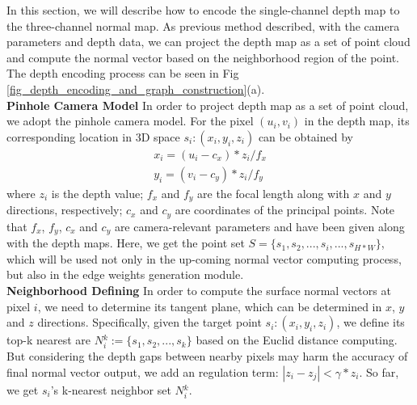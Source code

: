 \documentclass[journal]{IEEEtran}
\begin{document}
 
    In this section, we will describe how to encode the single-channel depth map to the three-channel normal map. As previous method \cite{yin2018geonet} described, with the camera parameters and depth data, we can project the depth map as a set of point cloud and compute the normal vector based on the neighborhood region of the point. The depth encoding process can be seen in Fig \ref{fig_depth_encoding_and_graph_construction}(a).\\   
 
    \textbf{Pinhole Camera Model}  In order to project depth map as a set of point cloud, we adopt the pinhole camera model. For the pixel $(u_{i},v_{i})$ in the depth map, its corresponding location in 3D space $\mathit{s_{i}}:(x_{i},y_{i},z_{i})$ can be obtained by
    \begin{equation}
        \begin{split}
        x_{i} = (u_{i} - c_{x})*z_{i}/f_{x}\\
        y_{i} = (v_{i} - c_{y})*z_{i}/f_{y}
        \end{split}
    \end{equation}
    where $z_{i}$ is the depth value; $f_{x}$ and $f_{y}$ are the focal length along with $x$ and $y$ directions, respectively; $c_{x}$ and $c_{y}$ are coordinates of the principal points. Note that $f_{x}$, $f_{y}$, $c_{x}$ and $c_{y}$ are camera-relevant parameters and have been given along with the depth maps. Here, we get the point set ${S}=\{ {s_{1}}, {s_{2}}, ..., {s_{i}} , ...  , {s_{H*W}} \}$, which will be used not only in the up-coming normal vector computing process, but also in the edge weights generation module.
    \\   
    
 
    \textbf{Neighborhood Defining}  In order to compute the surface normal vectors at pixel $i$, we need to determine its tangent plane, which can be determined in $x$, $y$ and $z$ directions. Specifically, given the target point ${s_{i}}:(x_{i},y_{i},z_{i})$, we define its top-k nearest are $N{_i^k}:=  \{ s_{1}, s_{2}, ..., s_k\}$ based on the Euclid distance computing. But considering the depth gaps between nearby pixels may harm the accuracy of final normal vector output, we add an regulation term: $ |z_{i} - z_{j} | < \gamma *z_{i} $. So far, we get ${s_{i}}$'s k-nearest neighbor set $N{_i^k}$. \\   
    
    
 
\end{document}
